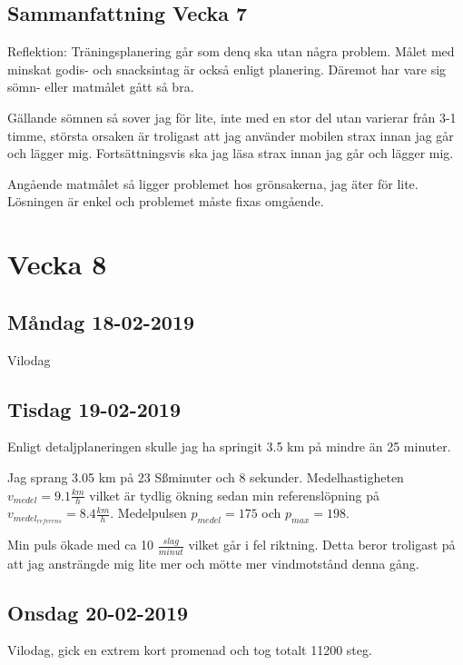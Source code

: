 \documentclass[a4paper, 12pt]{article}
\begin{document}
\subsection{Sammanfattning Vecka 7}

    Reflektion: Träningsplanering går som denq ska utan några problem. Målet med minskat godis- och snacksintag är också enligt planering. Däremot har vare sig sömn- eller matmålet gått så bra.
    
    Gällande sömnen så sover jag för lite, inte med en stor del utan varierar från 3-1 timme, största orsaken är troligast att jag använder mobilen strax innan jag går och lägger mig. Fortsättningsvis ska jag läsa strax innan jag går och lägger mig. 
    
    Angående matmålet så ligger problemet hos grönsakerna, jag äter för lite. Lösningen är enkel och problemet måste fixas omgående. 



\section{Vecka 8}

\subsection{Måndag 18-02-2019}
    Vilodag 
    

\subsection{Tisdag 19-02-2019}

    Enligt detaljplaneringen skulle jag ha springit 3.5 km på mindre än 25 minuter.
    
    Jag sprang 3.05 km på 23 Sßminuter och 8 sekunder. Medelhastigheten $v_{medel} = 9.1\frac{km}{h}$ vilket är tydlig ökning sedan min referenslöpning på $v_{medel_{referens}} = 8.4\frac{km}{h}$. Medelpulsen $p_{medel} = 175$ och $p_{max} = 198$.
    
    Min puls ökade med ca 10 $\frac{slag}{minut}$ vilket går i fel riktning. Detta beror troligast på att jag ansträngde mig lite mer och mötte mer vindmotstånd denna gång. 

\subsection{Onsdag 20-02-2019}

    Vilodag, gick en extrem kort promenad och tog totalt 11200 steg.
    
\end{document}
